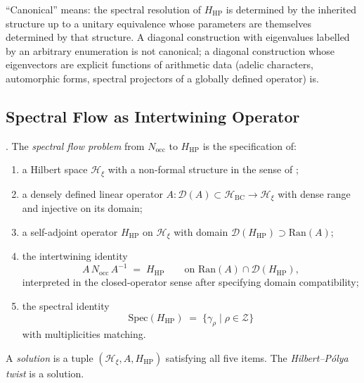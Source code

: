 \begin{remark}
\label{v4-arith:w9-r4:rem:canonical-domain}
``Canonical'' means: the spectral resolution of \(H_{\mathrm{HP}}\) is
determined by the inherited structure up to a unitary equivalence
whose parameters are themselves determined by that structure. A
diagonal construction with eigenvalues labelled by an arbitrary
enumeration is not canonical; a diagonal construction whose
eigenvectors are explicit functions of arithmetic data (adelic
characters, automorphic forms, spectral projectors of a globally
defined operator) is.
\end{remark}

\subsection{Spectral Flow as Intertwining Operator}
\label{v4-arith:w9-r4:setup:flow}

\begin{definition}
\label{v4-arith:w9-r4:def:spectral-flow}
\ClaimStatusDefinitional. The \emph{spectral flow problem} from
\(N_{\mathrm{occ}}\) to \(H_{\mathrm{HP}}\) is the specification of:
\begin{enumerate}
\item a Hilbert space \(\mathcal{H}_{\xi}\) with a non-formal structure
in the sense of ;
\item a densely defined linear operator
\(A:\mathcal{D}(A)\subset\mathcal{H}_{\mathrm{BC}}\to\mathcal{H}_{\xi}\)
with dense range and injective on its domain;
\item a self-adjoint operator \(H_{\mathrm{HP}}\) on \(\mathcal{H}_{\xi}\)
with domain \(\mathcal{D}(H_{\mathrm{HP}})\supset\mathrm{Ran}(A)\);
\item the intertwining identity
\begin{equation}
\label{v4-arith:w9-r4:eq:intertwine}
A\,N_{\mathrm{occ}}\,A^{-1}\;=\;H_{\mathrm{HP}}\qquad\text{on }\mathrm{Ran}(A)\cap\mathcal{D}(H_{\mathrm{HP}}),
\end{equation}
interpreted in the closed-operator sense after specifying domain
compatibility;
\item the spectral identity
\begin{equation}
\label{v4-arith:w9-r4:eq:spec-id}
\mathrm{Spec}(H_{\mathrm{HP}})\;=\;\{\gamma_{\rho}\mid\rho\in\mathcal{Z}\}
\end{equation}
with multiplicities matching.
\end{enumerate}
A \emph{solution} is a tuple \((\mathcal{H}_{\xi},A,H_{\mathrm{HP}})\)
satisfying all five items. The \emph{Hilbert--P\'olya twist} is a
solution.
\end{definition}

